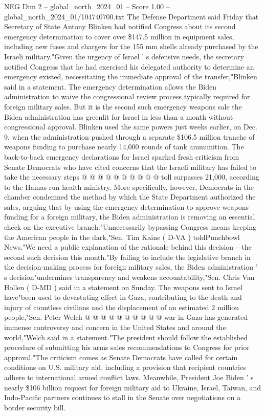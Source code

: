 \begin{textsample}{NEG Dim 2 – global\_north\_2024\_01 – Score 1.00 – global\_north\_2024\_01/104740700.txt}  \label{ex:f2_neg_336}
The Defense Department said Friday that Secretary of State Antony Blinken had notified Congress about its second emergency determination to cover over \$147.5 million in equipment sales, including new fuses and chargers for the 155 mm shells already purchased by the Israeli military."Given the urgency of Israel ' s defensive needs, the secretary notified Congress that he had exercised his delegated authority to determine an emergency existed, necessitating the immediate approval of the transfer,"Blinken said in a statement.
The emergency determination allows the Biden administration to waive the congressional review process typically required for foreign military sales.
But it is the second such emergency weapons sale the Biden administration has greenlit for Israel in less than a month without congressional approval.
Blinken used the same powers just weeks earlier, on Dec. 9, when the administration pushed through a separate \$106.5 million tranche of weapons funding to purchase nearly 14,000 rounds of tank ammunition.
The back-to-back emergency declarations for Israel sparked fresh criticism from Senate Democrats who have cited concerns that the Israeli military has failed to take the necessary steps @ @ @ @ @ @ @ @ @ @ toll surpasses 21,000, according to the Hamas-run health ministry.
More specifically, however, Democrats in the chamber condemned the method by which the State Department authorized the sales, arguing that by using the emergency determination to approve weapons funding for a foreign military, the Biden administration is removing an essential check on the executive branch."Unnecessarily bypassing Congress means keeping the American people in the dark,"Sen.
Tim Kaine ( D-VA ) toldPunchbowl News."We need a public explanation of the rationale behind this decision -- the second such decision this month."By failing to include the legislative branch in the decision-making process for foreign military sales, the Biden administration ' s decision"undermines transparency and weakens accountability,"Sen.
Chris Van Hollen ( D-MD ) said in a statement on Sunday.
The weapons sent to Israel have"been used to devastating effect in Gaza, contributing to the death and injury of countless civilians and the displacement of an estimated 2 million people,"Sen.
Peter Welch @ @ @ @ @ @ @ @ @ @ war in Gaza has generated immense controversy and concern in the United States and around the world,"Welch said in a statement."The president should follow the established procedure of submitting his arms sales recommendations to Congress for prior approval."The criticism comes as Senate Democrats have called for certain conditions on U.S. military aid, including a provision that recipient countries adhere to international armed conflict laws.
Meanwhile, President Joe Biden ' s nearly \$106 billion request for foreign military aid to Ukraine, Israel, Taiwan, and Indo-Pacific partners continues to stall in the Senate over negotiations on a border security bill.

\end{textsample}
